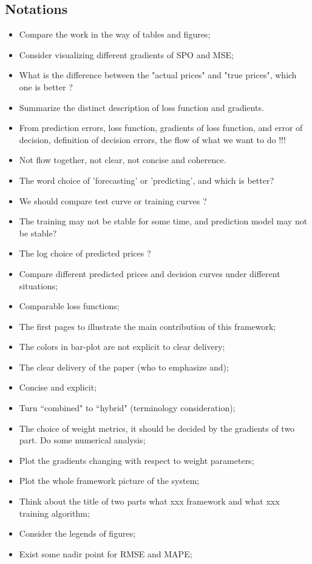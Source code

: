 \documentclass[journal]{IEEEtran}
\newcommand{\slw}{\color{blue}}
\begin{document}
\subsection*{Notations}
\begin{itemize}
  \item Compare the work in the way of tables and figures;
  \item Consider visualizing different gradients of SPO and MSE;
  \item What is the difference between the "actual prices" and "true prices", which one is better ?
  \item Summarize the distinct description of loss function and gradients.
  \item From prediction errors, loss function, gradients of loss function, and error of decision, definition of decision errors, the flow of what we want to do !!!
  \item Not flow together, not clear, not concise and coherence. 
  \item The word choice of 'forecasting' or 'predicting', and which is better?
  \item We should compare test curve or training curves ?
  \item The training may not be stable for some time, and prediction model may not be stable?
  \item The log choice of predicted prices ?
  \item Compare different predicted prices and decision curves under different situations;
  \item Comparable loss functions;
  \item The first pages to illustrate the main contribution of this framework;
  \item The colors in bar-plot are not explicit to clear delivery;
  \item The clear delivery of the paper (who to emphasize and);
  \item Concise and explicit;
  \item Turn {\slw ``combined"} to {\slw ``hybrid"} (terminology consideration);
  \item {\slw The choice of weight metrics, it should be decided by the gradients of two part. Do some numerical analysis};
  \item {\slw Plot the gradients changing with respect to weight parameters};
  \item {\slw Plot the whole framework picture of the system};
  \item Think about the title of two parts {\slw what xxx framework} and {\slw what xxx training algorithm};
  \item {\slw Consider the legends of figures; }
  \item {\slw Exist some nadir point for RMSE and MAPE;}
\end{itemize}
\end{document}
